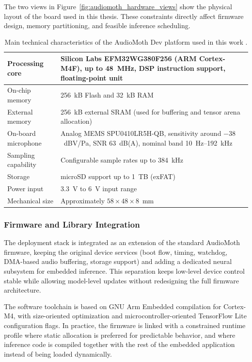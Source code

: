 \documentclass[a4paper,singleside,12pt]{report} %
\begin{document}
	The two views in Figure~\ref{fig:audiomoth_hardware_views} show the physical layout of the board used in this thesis. These constraints directly affect firmware design, memory partitioning, and feasible inference scheduling.

	\begin{table}[H]
		\centering
		\scriptsize
		\renewcommand{\arraystretch}{1.15}
		\setlength{\tabcolsep}{6pt}
		\caption[Main technical characteristics of the AudioMoth Dev platform.]{Main technical characteristics of the AudioMoth Dev platform used in this work \cite{audiomothdev2023}.}
		\label{tab:audiomoth_specs}
		\begin{tabular}{|l|p{9.0cm}|}
			\hline
			Processing core & Silicon Labs EFM32WG380F256 (ARM Cortex-M4F), up to 48~MHz, DSP instruction support, floating-point unit \\
			\hline
			On-chip memory & 256~kB Flash and 32~kB RAM \\
			\hline
			External memory & 256~kB external SRAM (used for buffering and tensor arena allocation) \\
			\hline
			On-board microphone & Analog MEMS SPU0410LR5H-QB, sensitivity around \(-38\)~dBV/Pa, SNR \(63\)~dB(A), nominal band 10~Hz--192~kHz \\
			\hline
			Sampling capability & Configurable sample rates up to 384~kHz \\
			\hline
			Storage & microSD support up to 1~TB (exFAT) \\
			\hline
			Power input & 3.3~V to 6~V input range \\
			\hline
			Mechanical size & Approximately \(58 \times 48 \times 8\)~mm \\
			\hline
		\end{tabular}
	\end{table}

\subsubsection{Firmware and Library Integration}
	The deployment stack is integrated as an extension of the standard AudioMoth firmware, keeping the original device services (boot flow, timing, watchdog, DMA-based audio buffering, storage support) and adding a dedicated neural subsystem for embedded inference. This separation keeps low-level device control stable while allowing model-level updates without redesigning the full firmware architecture.

	The software toolchain is based on GNU Arm Embedded compilation for Cortex-M4, with size-oriented optimization and microcontroller-oriented TensorFlow Lite configuration flags. In practice, the firmware is linked with a constrained runtime profile where static allocation is preferred for predictable behavior, and where inference code is compiled together with the rest of the embedded application instead of being loaded dynamically.
\end{document}

